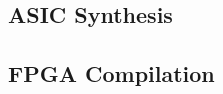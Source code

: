 \documentclass{ug}
\begin{document}
\ifdefined\ASICSYNTH
\subsection{ASIC Synthesis}
\label{sec:synth}

\fi

\ifdefined\FPGACOMP
\subsection{FPGA Compilation}
\label{sec:fpga}

\fi

% 

% 

% 

%
%
% 

% 

% 

% 
\end{document}
